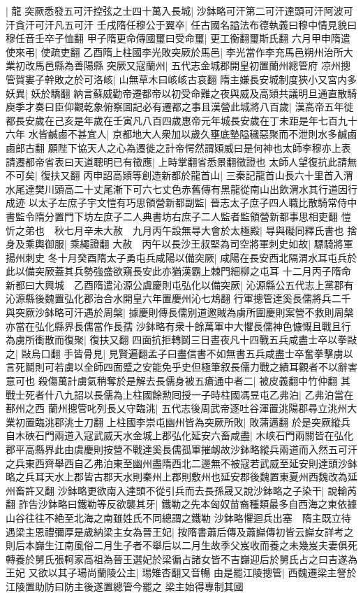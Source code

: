 |{
	龍}
突厥悉發五可汗控弦之士四十萬入長城|{
	沙鉢略可汗第二可汗達頭可汗阿波可汗貪汗可汗凡五可汗}
壬戌隋任穆公于翼卒|{
	任古國名謚法布德執義曰穆中情見貌曰穆任音壬卒子恤翻}
甲子隋更命傳國璽曰受命璽|{
	更工衡翻璽斯氏翻}
六月甲申隋遣使來弔|{
	使疏吏翻}
乙酉隋上柱國李光敗突厥於馬邑|{
	李光當作李充馬邑朔州治所大業初改馬邑縣為善陽縣}
突厥又寇蘭州|{
	五代志金城郡開皇初置蘭州總管府}
凉州摠管賀婁子幹敗之於可洛峐|{
	山無草木曰峐峐古哀翻}
隋主嫌長安城制度狹小又宮内多妖異|{
	妖於驕翻}
納言蘇威勸帝遷都帝以初受命難之夜與威及高熲共議明旦通直散騎庾季才奏曰臣仰觀乾象俯察圖記必有遷都之事且漢營此城將八百歲|{
	漢高帝五年徙都長安歲在己亥是年歲在壬寅凡八百四歲惠帝元年城長安歲在丁未距是年七百九十六年}
水皆鹹鹵不甚宜人|{
	京都地大人衆加以歲久壅底墊隘穢惡聚而不泄則水多鹹鹵鹵郎古翻}
願陛下協天人之心為遷徙之計帝愕然謂熲威曰是何神也太師李穆亦上表請遷都帝省表曰天道聰明已有徵應|{
	上時掌翻省悉景翻徵證也}
太師人望復抗此請無不可矣|{
	復扶又翻}
丙申詔高熲等創造新都於龍首山|{
	三秦記龍首山長六十里首入渭水尾達樊川頭高二十丈尾漸下可六七丈色赤舊傳有黑龍從南山出飲渭水其行道因行成迹}
以太子左庶子宇文愷有巧思領營新都副監|{
	晉志太子庶子四人職比散騎常侍中書監令隋分置門下坊左庶子二人典書坊右庶子二人監者監領營新都事思相吏翻}
愷忻之弟也　秋七月辛未大赦　九月丙午設無㝵大會於太極殿|{
	㝵與礙同釋氏書也}
捨身及乘輿御服|{
	乘繩證翻}
大赦　丙午以長沙王叔堅為司空將軍刺史如故|{
	驃騎將軍揚州刺史}
冬十月癸酉隋太子勇屯兵咸陽以備突厥|{
	咸陽在長安西北隔渭水耳屯兵於此以備突厥蓋其兵勢強盛欲窺長安此亦猶漢霸上棘門細柳之屯耳}
十二月丙子隋命新都曰大興城　乙酉隋遣沁源公虞慶則屯弘化以備突厥|{
	沁源縣公五代志上黨郡有沁源縣後魏置弘化郡治合水開皇六年置慶州沁七鴆翻}
行軍摠管達奚長儒將兵二千與突厥沙鉢略可汗遇於周槃|{
	據慶則傳長儒别道邀賊為虜所圍慶則案營不救則周槃亦當在弘化縣界長儒當作長孺}
沙鉢略有衆十餘萬軍中大懼長儒神色慷慨且戰且行為虜所衝散而復聚|{
	復扶又翻}
四面抗拒轉鬬三日晝夜凡十四戰五兵咸盡士卒以拳敺之|{
	敺烏口翻}
手皆骨見|{
	見賢遍翻孟子曰盡信書不如無書五兵咸盡士卒奮拳擊虜以言死鬬則可若虜以全師四面蹙之安能免乎史但極筆叙長儒力戰之績耳觀者不以辭害意可也}
殺傷萬計虜氣稍奪於是解去長儒身被五瘡通中者二|{
	被皮義翻中竹仲翻}
其戰士死者什八九詔以長儒為上柱國餘勲囘授一子時柱國馮昱屯乙弗泊|{
	乙弗泊當在鄯州之西}
蘭州摠管叱列長乂守臨洮|{
	五代志後周武帝逐吐谷渾置洮陽郡尋立洮州大業初置臨洮郡洮士刀翻}
上柱國李崇屯幽州皆為突厥所敗|{
	敗蒲邁翻}
於是突厥縱兵自木硤石門兩道入寇武威天水金城上郡弘化延安六畜咸盡|{
	木峡石門兩關皆在弘化郡平高縣界此由虞慶則按營不戰達奚長儒孤軍摧衂故沙鉢略縱兵兩道而入然五可汗之兵東西齊舉西自乙弗泊東至幽州盡隋西北二邊無不被寇若武威至延安則達頭沙鉢略之兵耳天水上郡皆古郡天水則秦州上郡則敷州也延安郡後魏置東夏州西魏改為延州畜許又翻}
沙鉢略更欲南入達頭不從引兵而去長孫晟又說沙鉢略之子染干|{
	說輸芮翻}
詐告沙鉢略曰鐵勒等反欲襲其牙|{
	鐵勒之先本匈奴苗裔種類最多自西海之東依據山谷往往不絶至北海之南雖姓氏不同總謂之鐵勒}
沙鉢略懼迴兵出塞　隋主既立待遇梁主恩禮彌厚是歲納梁主女為晉王妃|{
	按隋書蕭后傳及蕭巋傳初皆云巋女詳考之則后本巋生江南風俗二月生子者不舉后以二月生故季父岌收而養之未幾岌夫妻俱死轉養於舅氏張軻家高祖為晉王選妃於梁徧占諸女皆不吉巋迎后於舅氏占之曰吉遂為王妃}
又欲以其子瑒尚蘭陵公主|{
	㻛雉杏翻又音暢}
由是罷江陵摠管|{
	西魏遷梁主詧於江陵置助防曰防主後遂置總管今罷之}
梁主始得專制其國

